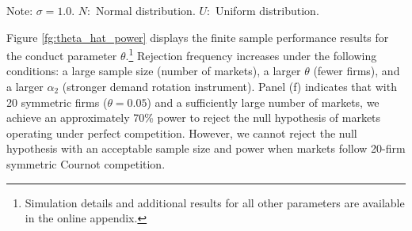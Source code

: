 \documentclass[11pt, a4paper]{article}
\begin{document}
\begin{table}[!htbp]
    \caption{True parameters and distributions}
    \label{tb:parameter_setting}
    \begin{center}
    \end{center}
    \footnotesize
    Note: $\sigma=1.0$. $N:$ Normal distribution. $U:$ Uniform distribution.
\end{table}

Figure \ref{fg:theta_hat_power} displays the finite sample performance results for the conduct parameter $\theta$.\footnote{Simulation details and additional results for all other parameters are available in the online appendix.} 
Rejection frequency increases under the following conditions: a large sample size (number of markets), a larger $\theta$ (fewer firms), and a larger $\alpha_2$ (stronger demand rotation instrument).
Panel (f) indicates that with 20 symmetric firms ($\theta=0.05$) and a sufficiently large number of markets, we achieve an approximately 70\% power to reject the null hypothesis of markets operating under perfect competition. 
However, we cannot reject the null hypothesis with an acceptable sample size and power when markets follow 20-firm symmetric Cournot competition.
\end{document}
